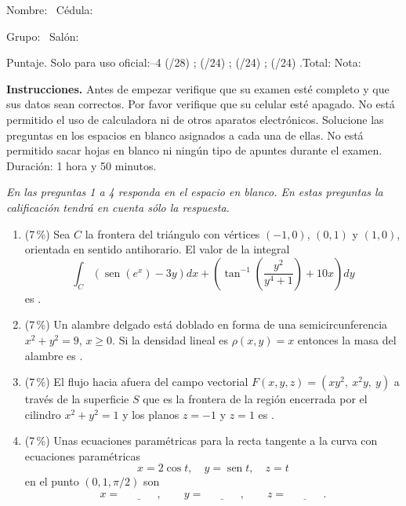 \documentclass[11pt]{article}
\begin{document}
\examheader

\vspace{4pt}
\noindent Nombre: \dotfill\ Cédula: \dotfill

\vspace{4pt}
\noindent Grupo: \dotfill\ Salón: \dotfill

\vspace{4pt}
\noindent Puntaje. Solo para uso oficial:--4 (/28) \dotfill; (/24) \dotfill; (/24) \dotfill; (/24) \dotfill.\quad Total: \dotfill\quad Nota: \dotfill

\vspace{6pt}
\noindent\textbf{Instrucciones.} Antes de empezar verifique que su examen esté completo y que sus datos sean correctos. Por favor verifique que su celular esté apagado. No está permitido el uso de calculadora ni de otros aparatos electrónicos. Solucione las preguntas en los espacios en blanco asignados a cada una de ellas. No está permitido sacar hojas en blanco ni ningún tipo de apuntes durante el examen. Duración: 1 hora y 50 minutos.

\vspace{8pt}
\noindent\textit{En las preguntas 1 a 4 responda en el espacio en blanco. En estas preguntas la calificación tendrá en cuenta sólo la respuesta.}

\begin{enumerate}
\item{} (7\,\%) Sea $C$ la frontera del triángulo con vértices $(-1,0)$, $(0,1)$ y $(1,0)$, orientada en sentido antihorario. El valor de la integral
\[
\int_C \left(\operatorname{sen}(e^x) - 3y\right)dx + \left(\tan^{-1}\!\left(\frac{y^2}{y^4+1}\right) + 10x\right)dy
\]
es \underline{\phantom{XXXXXX}}.

\item{} (7\,\%) Un alambre delgado está doblado en forma de una semicircunferencia $x^2 + y^2 = 9$, $x \geq 0$. Si la densidad lineal es $\rho(x,y) = x$ entonces la masa del alambre es \underline{\phantom{XXXXXX}}.

\item{} (7\,\%) El flujo hacia afuera del campo vectorial $F(x,y,z) = (xy^2,\ x^2y,\ y)$ a través de la superficie $S$ que es la frontera de la región encerrada por el cilindro $x^2 + y^2 = 1$ y los planos $z = -1$ y $z = 1$ es \underline{\phantom{XXXXXX}}.

\item{} (7\,\%) Unas ecuaciones paramétricas para la recta tangente a la curva con ecuaciones paramétricas
\[
x = 2\cos t,\quad y = \operatorname{sen} t,\quad z = t
\]
en el punto $(0, 1, \pi/2)$ son
\[
x = \underline{\phantom{XXXX}},\qquad y = \underline{\phantom{XXXX}},\qquad z = \underline{\phantom{XXXX}}.
\]
\end{enumerate}
\end{document}
